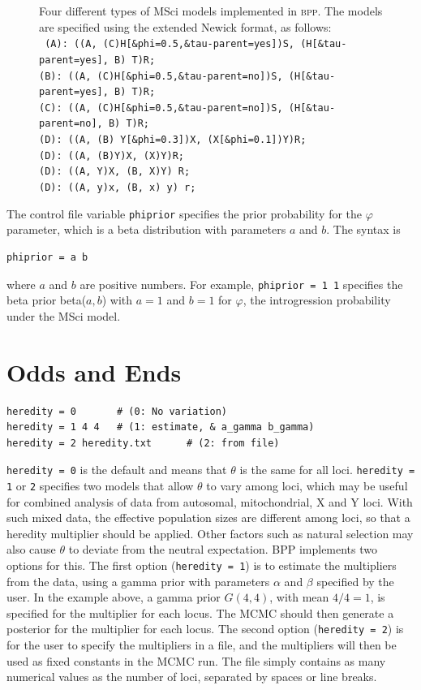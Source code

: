 \documentclass{book}
\numberwithin{equation}{section} \renewcommand{\baselinestretch}{0.55}
\begin{document}
\begin{figure} [t]
  \caption{Four different types of MSci models implemented in
    \textsc{bpp}.  The models are
    specified using the extended Newick format, as follows: \\
    \texttt{
      (A): ((A, (C)H[\&phi=0.5,\&tau-parent=yes])S, (H[\&tau-parent=yes], B) T)R; \\
      (B): ((A, (C)H[\&phi=0.5,\&tau-parent=no])S, (H[\&tau-parent=yes], B) T)R; \\
      (C): ((A, (C)H[\&phi=0.5,\&tau-parent=no])S, (H[\&tau-parent=no], B) T)R; \\
      (D): ((A, (B) Y[\&phi=0.3])X, (X[\&phi=0.1])Y)R; \\
      (D): ((A, (B)Y)X, (X)Y)R; \\
      (D): ((A, Y)X, (B, X)Y) R; \\
      (D): ((A, y)x, (B, x) y) r; } } \label{fig-msci-models}
\end{figure}
The control file variable \texttt{phiprior} specifies the prior
probability for the $\varphi$ parameter, which is a beta distribution
with parameters $a$ and $b$.  The syntax is
\begin{verbatim}
phiprior = a b
\end{verbatim}
where $a$ and $b$ are positive numbers. For example, \texttt{phiprior
  = 1 1} specifies the beta prior beta($a, b$) with $a = 1$ and
$b = 1$ for $\varphi$, the introgression probability under the MSci
model.


\chapter{Odds and Ends}


\begin{verbatim}
heredity = 0       # (0: No variation)
heredity = 1 4 4   # (1: estimate, & a_gamma b_gamma)
heredity = 2 heredity.txt      # (2: from file)
\end{verbatim}

\texttt{heredity = 0} is the default and means that $\theta$ is the
same for all loci. \texttt{heredity = 1} or \texttt{2} specifies two
models that allow $\theta$ to vary among loci, which may be useful for
combined analysis of data from autosomal, mitochondrial, X and Y loci.
With such mixed data, the effective population sizes are different
among loci, so that a heredity multiplier \citep[inheritance
scalars][]{Hey2004} should be applied.  Other factors such as natural
selection may also cause $\theta$ to deviate from the neutral
expectation.  \textsc{BPP} implements two options for this.  The first
option (\texttt{heredity = 1}) is to estimate the multipliers from the
data, using a gamma prior with parameters $\alpha$ and $\beta$
specified by the user.  In the example above, a gamma prior $G(4, 4)$,
with mean $4/4 = 1$, is specified for the multiplier for each locus.
The MCMC should then generate a posterior for the multiplier for each
locus.  The second option (\texttt{heredity = 2}) is for the user to
specify the multipliers in a file, and the multipliers will then be
used as fixed constants in the MCMC run.  The file simply contains as
many numerical values as the number of loci, separated by spaces or
line breaks.
\end{document}
